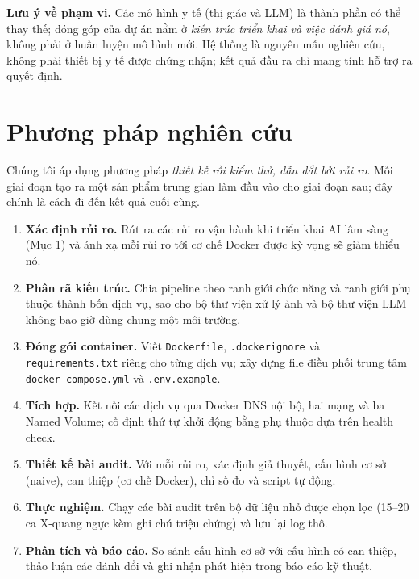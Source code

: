 \documentclass[11pt,a4paper]{article}
\begin{document}
\textbf{Lưu ý về phạm vi.} Các mô hình y tế (thị giác và LLM) là thành phần có thể thay thế; đóng góp của dự án nằm ở \emph{kiến trúc triển khai và việc đánh giá nó}, không phải ở huấn luyện mô hình mới. Hệ thống là nguyên mẫu nghiên cứu, không phải thiết bị y tế được chứng nhận; kết quả đầu ra chỉ mang tính hỗ trợ ra quyết định.

\section{Phương pháp nghiên cứu}
Chúng tôi áp dụng phương pháp \emph{thiết kế rồi kiểm thử, dẫn dắt bởi rủi ro}. Mỗi giai đoạn tạo ra một sản phẩm trung gian làm đầu vào cho giai đoạn sau; đây chính là cách đi đến kết quả cuối cùng.

\begin{enumerate}
  \item \textbf{Xác định rủi ro.} Rút ra các rủi ro vận hành khi triển khai AI lâm sàng (Mục 1) và ánh xạ mỗi rủi ro tới cơ chế Docker được kỳ vọng sẽ giảm thiểu nó.
  \item \textbf{Phân rã kiến trúc.} Chia pipeline theo ranh giới chức năng và ranh giới phụ thuộc thành bốn dịch vụ, sao cho bộ thư viện xử lý ảnh và bộ thư viện LLM không bao giờ dùng chung một môi trường.
  \item \textbf{Đóng gói container.} Viết \texttt{Dockerfile}, \texttt{.dockerignore} và \texttt{requirements.txt} riêng cho từng dịch vụ; xây dựng file điều phối trung tâm \texttt{docker-compose.yml} và \texttt{.env.example}.
  \item \textbf{Tích hợp.} Kết nối các dịch vụ qua Docker DNS nội bộ, hai mạng và ba Named Volume; cố định thứ tự khởi động bằng phụ thuộc dựa trên health check.
  \item \textbf{Thiết kế bài audit.} Với mỗi rủi ro, xác định giả thuyết, cấu hình cơ sở (naive), can thiệp (cơ chế Docker), chỉ số đo và script tự động.
  \item \textbf{Thực nghiệm.} Chạy các bài audit trên bộ dữ liệu nhỏ được chọn lọc (15--20 ca X-quang ngực kèm ghi chú triệu chứng) và lưu lại log thô.
  \item \textbf{Phân tích và báo cáo.} So sánh cấu hình cơ sở với cấu hình có can thiệp, thảo luận các đánh đổi và ghi nhận phát hiện trong báo cáo kỹ thuật.
\end{enumerate}
\end{document}
